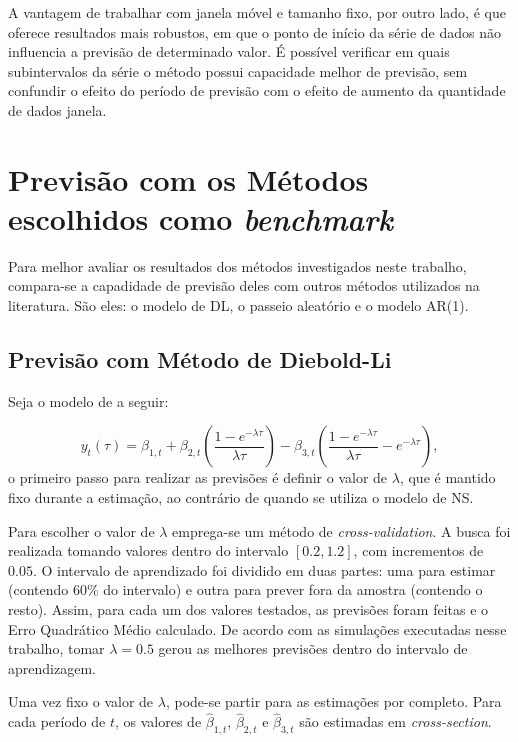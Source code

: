 \documentclass[
	12pt,				%
	openright,			%
	oneside,			%
	a4paper,			%
	english,			%
	brazil				%
	]{dissertacao-ufrgs-abntex2}
\begin{document}
A vantagem de trabalhar com janela móvel e tamanho fixo, por outro lado, é que oferece resultados mais robustos, em que o ponto de início da série de dados não influencia a previsão de determinado valor. É possível verificar em quais subintervalos da série o método possui capacidade melhor de previsão, sem confundir o efeito do período de previsão com o efeito de aumento da quantidade de dados janela.

\section{Previsão com os Métodos escolhidos como \emph{benchmark}}

Para melhor avaliar os resultados dos métodos investigados neste trabalho, compara-se a capadidade de previsão deles com outros métodos utilizados na literatura. São eles: o modelo de DL, o passeio aleatório e o modelo AR(1).

\subsection{Previsão com Método de Diebold-Li}

Seja o modelo de  a seguir:

$$y_{t}(\tau)=\beta_{1,t}+\beta_{2,t}\left( \frac { 1-e^{ -\lambda \tau  } }{ \lambda\tau}  \right) -\beta_{3,t}\left( \frac { 1-e^{ -\lambda \tau  } }{ \lambda \tau  } -e^{ -\lambda \tau  } \right),$$
o primeiro passo para realizar as previsões é definir o valor de $\lambda$, que é mantido fixo durante a estimação, ao contrário de quando se utiliza o modelo de NS. 

Para escolher o valor de $\lambda$ emprega-se um método de \emph{cross-validation}. A busca foi realizada tomando valores dentro do intervalo $[0.2,1.2]$, com incrementos de $0.05$. O intervalo de aprendizado foi dividido em duas partes: uma para estimar (contendo 60\% do intervalo) e outra para prever fora da amostra (contendo o resto). Assim, para cada um dos valores testados, as previsões foram feitas e o Erro Quadrático Médio calculado. 
De acordo com as simulações executadas nesse trabalho, tomar $\lambda=0.5$ gerou as melhores previsões dentro do intervalo de aprendizagem.

Uma vez fixo o valor de $\lambda$, pode-se partir para as estimações por completo. Para cada período de $t$, os valores de $\hat{\beta}_{1,t}$, $\hat{\beta}_{2,t}$ e $\hat{\beta}_{3,t}$ são estimadas em \emph{cross-section}.
\end{document}
